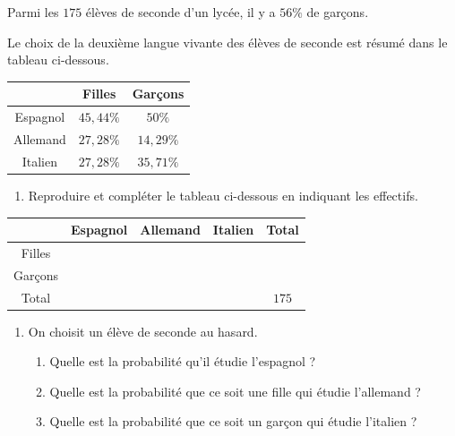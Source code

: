 \begin{exo}
	Parmi les $175$ élèves de seconde d'un lycée, il y a $56\%$ de garçons.

	Le choix de la deuxième langue vivante des élèves de seconde est résumé dans le tableau ci-dessous.

	\begin{center}
		\def\arraystretch{1.5}\small
		\begin{tabular}{|c|c|c|} \hline
			                            & \cellcolor{gray!30}Filles & \cellcolor{gray!30}Garçons \\ \hline
			\cellcolor{gray!30}Espagnol & $45,44\%$                 & $50\%$                     \\ \hline
			\cellcolor{gray!30}Allemand & $27,28\%$                 & $14,29\%$                  \\ \hline
			\cellcolor{gray!30}Italien  & $27,28\%$                 & $35,71\%$                  \\ \hline
		\end{tabular}
	\end{center}

	\begin{enumerate}
		\item Reproduire et compléter le tableau ci-dessous en indiquant les effectifs.
	\end{enumerate}
	\begin{center}
		\def\arraystretch{1.5}\small
		\begin{tabular}{|c|c|c|c|c|} \hline
			                           & \cellcolor{gray!30}Espagnol & \cellcolor{gray!30}Allemand & \cellcolor{gray!30}Italien & \cellcolor{gray!30}Total \\ \hline
			\cellcolor{gray!30}Filles  &                             &                             &                            &                          \\ \hline
			\cellcolor{gray!30}Garçons &                             &                             &                            &                          \\ \hline
			\cellcolor{gray!30}Total   &                             &                             &                            & $175$                    \\ \hline
		\end{tabular}
	\end{center}
	\begin{enumerate}[resume]
		\item On choisit un élève de seconde au hasard.
		      \begin{enumerate}
			      \item Quelle est la probabilité qu'il étudie l'espagnol ?
			      \item Quelle est la probabilité que ce soit une fille qui étudie l'allemand ?
			      \item Quelle est la probabilité que ce soit un garçon qui étudie l'italien ?
		      \end{enumerate}
	\end{enumerate}
\end{exo}
